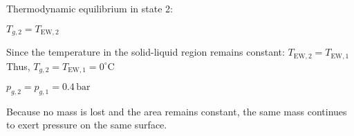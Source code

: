 Thermodynamic equilibrium in state 2:  

\( T_{g,2} = T_{\text{EW},2} \)  

Since the temperature in the solid-liquid region remains constant:  
\( T_{\text{EW},2} = T_{\text{EW},1} \)  
Thus, \( T_{g,2} = T_{\text{EW},1} = 0^\circ \text{C} \)  

\( p_{g,2} = p_{g,1} = 0.4 \, \text{bar} \)  

Because no mass is lost and the area remains constant, the same mass continues to exert pressure on the same surface.